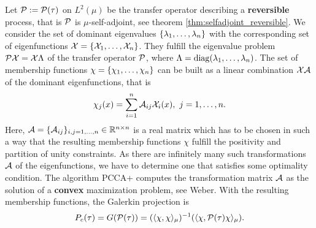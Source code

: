 Let $\mathcal{P} := \mathcal{P}(\tau)$ on $L^2(\mu)$ be the transfer operator describing a \textbf{reversible} process, that is $\mathcal{P}$ is $\mu$-self-adjoint, see theorem \ref{thm:selfadjoint_reversible}.
We consider the set of dominant eigenvalues $\{\lambda_1,\dots,\lambda_n\}$ with the corresponding set of eigenfunctions $\mathcal{X} = \{\mathcal{X}_1,\dots,\mathcal{X}_n\}$.
They fulfill the eigenvalue problem $\mathcal{P} \mathcal{X} = \mathcal{X} \Lambda$ of the transfer operator $\mathcal{P}$, where $\Lambda = \mathrm{diag}(\lambda_1,\dots,\lambda_n)$.
The set of membership functions $\chi= \{\chi_1,\dots,\chi_n \}$ can be built as a linear combination $\mathcal{X} \mathcal{A}$ of the dominant eigenfunctions, that is
\begin{equation}
\label{eq:pcca}
\chi_j(x) = \sum_{i=1}^n \mathcal{A}_{ij} \mathcal{X}_i(x), \ j=1,\dots,n.
\end{equation}
Here,  $\mathcal{A} = \{\mathcal{A}_{ij}\}_{i,j=1,\dots,n} \in \mathbb{R}^{n\times n}$ is a real matrix which has to be chosen in such a way that the resulting membership functions $\chi$ fulfill the positivity and partition of unity constraints.
As there are infinitely many such transformations $\mathcal{A}$ of the eigenfunctions, we have to determine one that satisfies some optimality condition.
The algorithm PCCA+ computes the transformation matrix $\mathcal{A}$ as the solution of a \textbf{convex} maximization problem, see Weber\cite{weber2006meshless}. %
With the resulting membership functions, the Galerkin projection is %
\begin{equation}
\label{eq:galerkin2}
	P_c(\tau)  = G(\mathcal{P}(\tau)) = (\langle \chi, \chi \rangle_\mu)^{-1} (\langle \chi, \mathcal{P}(\tau) \chi \rangle_\mu).
\end{equation}

